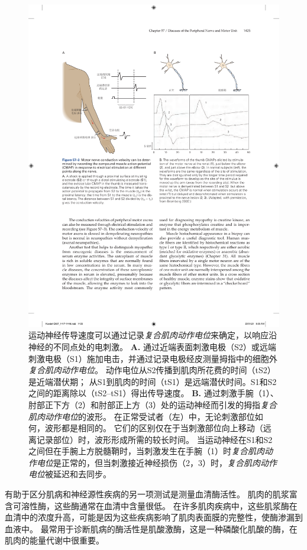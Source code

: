 \begin{figure}[htbp]
	\centering
	\includegraphics[width=0.95\linewidth]{chap57/fig_57_3}
	\caption{运动神经传导速度可以通过记录\textit{复合肌肉动作电位}来确定，以响应沿神经的不同点处的电刺激。
		\textbf{A.} 通过近端表面刺激电极（S2）或远端刺激电极（S1）施加电击，并通过记录电极经皮测量拇指中的细胞外\textit{复合肌肉动作电位}。
		动作电位从S2传播到肌肉所花费的时间（tS2）是近端潜伏期；
		从S1到肌肉的时间（tS1）是远端潜伏时间。S1和S2之间的距离除以（tS2–tS1）得出传导速度。
		\textbf{B.} 通过刺激手腕（1）、肘部正下方（2）和肘部正上方（3）处的运动神经而引发的拇指\textit{复合肌肉动作电位}的波形。
		在正常受试者（左）中，无论刺激部位如何，波形都是相同的。
		它们的区别仅在于当刺激部位向上移动（远离记录部位）时，波形形成所需的较长时间。
		当运动神经在S1和S2之间但在手腕上方脱髓鞘时，当刺激发生在手腕（1）时\textit{复合肌肉动作电位}是正常的，但当刺激接近神经损伤（2，3）时，\textit{复合肌肉动作电位}被延迟和去同步\cite{bromberg2002acute}。}
	\label{fig:57_3}
\end{figure}


有助于区分肌病和神经源性疾病的另一项测试是测量血清酶活性。
肌肉的肌浆富含可溶性酶，这些酶通常在血清中含量很低。
在许多肌肉疾病中，这些肌浆酶在血清中的浓度升高，可能是因为这些疾病影响了肌肉表面膜的完整性，使酶渗漏到血液中。
最常用于诊断肌病的酶活性是肌酸激酶，这是一种磷酸化肌酸的酶，在肌肉的能量代谢中很重要。


